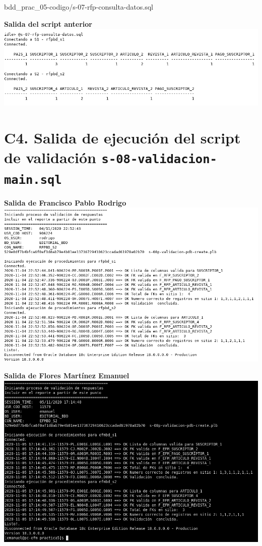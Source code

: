 \documentclass{article}
\begin{document}

{bdd_prac_05-codigo/s-07-rfp-consulta-datos.sql}

\newpage
\textbf{Salida del script anterior}\\
\includegraphics[width=\linewidth]{bdd_prac05-c3-consulta-datos}

\section*{C4. Salida de ejecución del script de validación 
\texttt{s-08-validacion-main.sql}}            

\textbf{Salida de Francisco Pablo Rodrigo}\\
\includegraphics[width=\linewidth]{bdd_prac05-validador-rodrigo}

\textbf{Salida de Flores Martínez Emanuel}\\
\includegraphics[width=\linewidth]{bdd_prac05-validador-emanuel}
\end{document}
